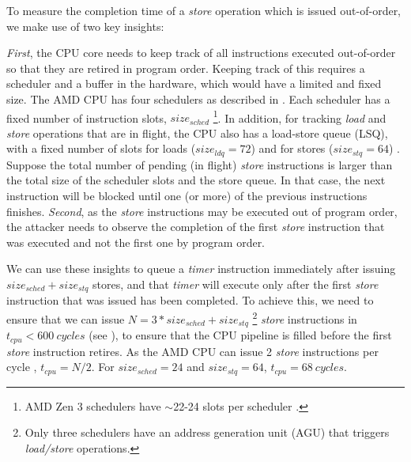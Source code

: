 To measure the completion time of a \textit{store} operation which is issued out-of-order, we make use of two key insights:

\textit{First}, the CPU core needs to keep track of all instructions executed out-of-order so that they are retired in program order.
Keeping track of this requires a scheduler and a buffer in the hardware, which would have a limited and fixed size.
The AMD CPU has four schedulers as described in . Each scheduler has a fixed number of instruction slots, $size_{sched}$
\footnote{AMD Zen 3 schedulers have $\sim$22-24 slots per scheduler \cite{gast2023squip}.}.
In addition, for tracking \textit{load} and \textit{store} operations that are in flight, the CPU also has a load-store queue (LSQ), with a fixed number of slots for loads ($size_{ldq} = 72$) and for stores ($size_{stq} = 64$) \cite{amd_7003_software_optimization_guide}.
Suppose the total number of pending (in flight) \textit{store} instructions is larger than the total size of the scheduler slots and the store queue. 
In that case, the next instruction will be blocked until one (or more) of the previous instructions finishes.
\textit{Second}, as the \textit{store} instructions may be executed out of program order, the attacker needs to observe the completion of the first \textit{store} instruction that was executed and not the first one by program order.

We can use these insights to queue a \textit{timer} instruction immediately after issuing $size_{sched} + size_{stq}$ stores, and that \textit{timer} will execute only after the first \textit{store} instruction that was issued has been completed.
To achieve this, we need to ensure that we can issue $N = 3 * size_{sched} + size_{stq}$ 
\footnote{Only three schedulers have an address generation unit (AGU) that triggers \textit{load/store} operations.}
\textit{store} instructions in $t_{cpu} < 600~cycles$ (see ), to ensure that the CPU pipeline is filled before the first \textit{store} instruction retires.
As the AMD CPU can issue 2 \textit{store} instructions per cycle \cite{amd_7003_software_optimization_guide}, $t_{cpu} = N/2$.
For $size_{sched} = 24$ and $size_{stq} = 64$, $t_{cpu} = 68~cycles$.


